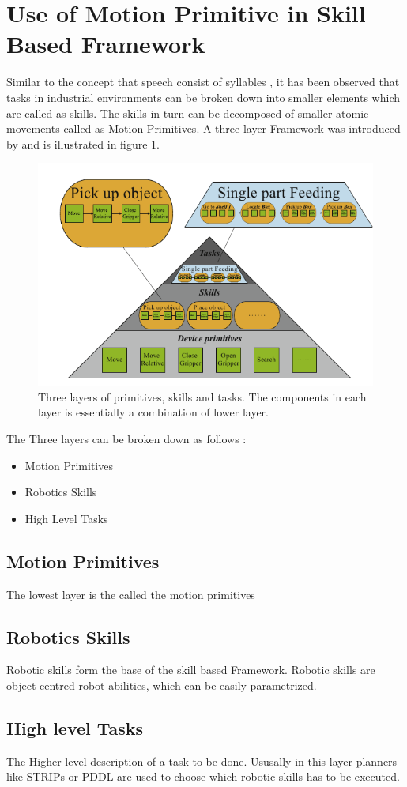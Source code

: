 \section{Use of Motion Primitive in Skill Based Framework}
Similar to the concept that speech consist of syllables , it
has been observed that tasks in industrial environments can be broken down into
smaller elements which are called as skills. 
The skills in turn can be decomposed of smaller atomic movements called as Motion Primitives.
A  three layer Framework was introduced by \cite{pedersen_robot_2015} and is illustrated in figure 1.


\begin{figure}[htp]
\centering
\includegraphics[scale=0.5]{images/skill_framework.png}
\caption[Skill based framework]{Three layers of primitives, skills and tasks. The components in each layer is essentially a combination of lower layer. \cite{pedersen_robot_2015}}
\label{}
\end{figure}

The Three layers can be broken down as follows :
\begin{itemize}
    \item Motion Primitives
    \item Robotics Skills
    \item High Level Tasks
\end{itemize}

\subsection{Motion Primitives}
The lowest layer is the called the motion primitives

\subsection{Robotics Skills}
Robotic skills form the base of the skill based Framework.
Robotic skills are object-centred robot abilities, which can be easily parametrized.
  

\subsection{High level Tasks}
The Higher level description of a task to be done. Ususally in this layer planners like STRIPs or PDDL 
are used to choose which robotic skills has to be executed.


